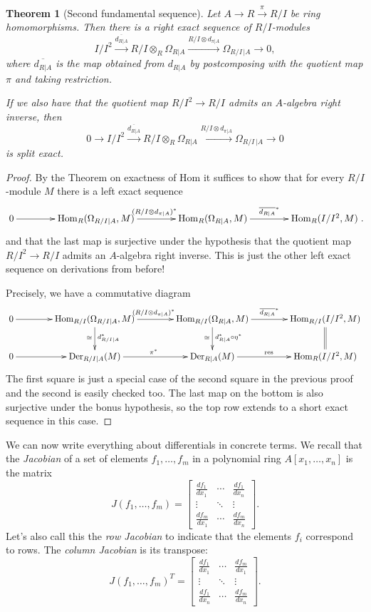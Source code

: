 \documentclass{amsart}[12pt]
\def\Der{\operatorname{Der}}
\newcommand{\Hom}{\mathrm{Hom}}
\numberwithin{equation}{section}
\theoremstyle{plain} %
\newtheorem{thm}[equation]{Theorem}
\theoremstyle{definition}
\theoremstyle{remark}
\newcommand{\xra}[1]{\xrightarrow{#1}}
\begin{document}
\begin{thm}[Second fundamental sequence]
Let $A\to R \xra{\pi} R/I$ be ring homomorphisms. Then there is a right exact sequence of $R/I$-modules
\[ I/I^2 \xra{\overline{d_{R|A}} } R/I \otimes_R \Omega_{R|A} \xra{R/I \otimes d_{\pi|A}} \Omega_{R/I \,|A} \to 0 ,\]
where $\overline{d_{R|A}}$ is the map obtained from $d_{R|A}$ by postcomposing with the quotient map $\pi$ and taking restriction.

If we also have that the quotient map $R/I^2\to R/I$ admits an $A$-algebra right inverse, then 
\[ 0 \to I/I^2 \xra{\overline{d_{R|A}} } R/I \otimes_R \Omega_{R|A} \xra{R/I \otimes d_{\pi|A}} \Omega_{R/I \,|A} \to 0 \]
is split exact.
\end{thm}
\begin{proof}
By the Theorem on exactness of Hom it suffices to show that for every $R/I$-module $M$ there is a left exact sequence
\[ \xymatrix@C=4em{ 0 \ar[r] & \Hom_{R}(\Omega_{R/I | A},M) \ar[r]^{(R/I \otimes d_{\pi|A})^*} & \Hom_{R}(\Omega_{R|A},M) \ar[r]^-{\overline{d_{R|A}}^*} & \Hom_{R}(I/I^2,M)}. \]
and that the last map is surjective under the hypothesis that  the quotient map $R/I^2\to R/I$ admits an $A$-algebra right inverse.
This is just the other left exact sequence on derivations from before! 

Precisely, we have a commutative diagram
\[ \xymatrix@C=4em{ 0 \ar[r] & \Hom_{R/I}(\Omega_{R/I | A},M) \ar[r]^{(R/I \otimes d_{\pi|A})^*} \ar[d]^{d_{R/I |A}^*}_{\cong} & \Hom_{R/I}(\Omega_{R|A},M) \ar[r]^-{\overline{d_{R|A}}^*} \ar[d]^{d_{R|A}^* \circ \eta^*}_{\cong} & \Hom_{R/I}(I/I^2,M) \ar@{=}[d]  \\
0\ar[r] & \Der_{R/I | A}(M) \ar[r]^{\mathrm{\pi^*}} & \Der_{R|A}(M) \ar[r]^{\mathrm{res}} & \Hom_R(I/I^2,M)
} \]
The first square is just a special case of the second square in the previous proof and the second is easily checked too. The last map on the bottom is also surjective under the bonus hypothesis, so the top row extends to a short exact sequence in this case.
\end{proof}

We can now write everything about differentials in concrete terms. We recall that the \emph{Jacobian} of a set of elements $f_1,\dots,f_m$ in a polynomial ring $A[x_1,\dots,x_n]$ is the matrix
\[ J(f_1,\dots,f_m) = \begin{bmatrix} \frac{df_1}{dx_1} & \cdots & \frac{df_1}{dx_n}\\ 
\vdots & \ddots & \vdots \\
 \frac{df_m}{dx_1} & \cdots & \frac{df_m}{dx_n} \end{bmatrix}.\]
 Let's also call this the \emph{row Jacobian} to indicate that the elements $f_i$ correspond to rows. The \emph{column Jacobian} is its transpose:
 \[ J(f_1,\dots,f_m)^T = \begin{bmatrix} \frac{df_1}{dx_1} & \cdots & \frac{df_m}{dx_1}\\ 
\vdots & \ddots & \vdots \\
 \frac{df_1}{dx_n} & \cdots & \frac{df_m}{dx_n} \end{bmatrix}.\]
\end{document}
